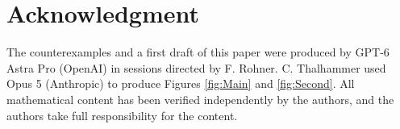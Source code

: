 \documentclass[11pt,a4paper]{amsart}
\theoremstyle{remark}
\numberwithin{equation}{section}
\newcommand{\R}{\mathbb R}
\begin{document}







\section*{Acknowledgment}
The counterexamples and a first draft of this paper were
produced by GPT-6 Astra Pro (OpenAI) in sessions directed by F. Rohner. C. Thalhammer used Opus 5 (Anthropic) to produce Figures \ref{fig:Main} and \ref{fig:Second}. All mathematical content has been
verified independently by the authors, and the authors take full
responsibility for the content.
\begingroup
\setlength{\emergencystretch}{2em}
\printbibliography
\endgroup
\end{document}

